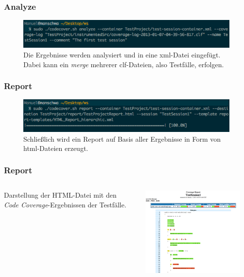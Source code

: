 \documentclass{beamer}
\begin{document}
  \begin{frame}\frametitle{Analyze}
    \begin{figure}%
			\includegraphics[width=\columnwidth]{pictures/demo_commandline/04_analyse.png}%
			\caption{Die Ergebnisse werden analysiert und in eine xml-Datei eingefügt. Dabei kann ein \textit{merge} mehrerer clf-Dateien, also Testfälle, erfolgen.}%
			\label{}%
		\end{figure}
  \end{frame}
  
  \begin{frame}\frametitle{Report}
    \begin{figure}%
			\includegraphics[width=\columnwidth]{pictures/demo_commandline/05_report.png}%
			\caption{Schließlich wird ein Report auf Basis aller Ergebnisse in Form von html-Dateien erzeugt.}%
			\label{}%
		\end{figure}
  \end{frame}
  
  \begin{frame}\frametitle{Report}
    \begin{columns}
      \begin{column}{5cm}
        Darstellung der HTML-Datei mit den\\
        \textit{Code Coverage}-Ergebnissen der Testfälle.
        \vspace{1cm}
      \end{column}
      \begin{column}{5cm}
        \begin{overprint}
          \includegraphics[height=45mm]{pictures/demo_commandline/06_report_html.png}
        \end{overprint}
      \end{column}
    \end{columns}
  \end{frame}
\end{document}
